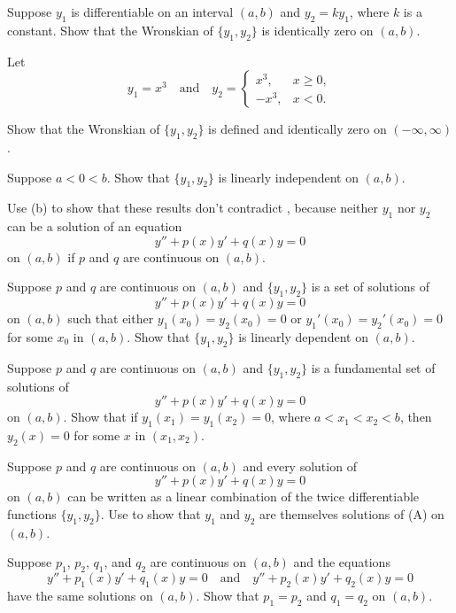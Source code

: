 \begin{exerciselist}
\item\label{exer:5.1.28}Suppose $y_1$ is differentiable on an interval  $(a,b)$
and $y_2=ky_1$, where $k$ is a constant. Show that the Wronskian of
$\{y_1,y_2\}$ is identically zero on  $(a,b)$.

\item\label{exer:5.1.29}Let
\[
y_1=x^3\quad\text{and}\quad y_2=
\begin{cases}
x^3,&x\ge 0,\\
-x^3,&x<0.
\end{cases}
\]
\begin{alist}
\item %
Show that the Wronskian of $\{y_1,y_2\}$ is defined and identically
zero on
$(-\infty,\infty)$.
\item %
Suppose $a<0<b$.
Show that $\{y_1,y_2\}$ is linearly independent on  $(a,b)$.
\item %
Use (b) to show that these results don't
contradict , because neither $y_1$ nor $y_2$
can be a solution of an equation
\[
y''+p(x)y'+q(x)y=0
\]
on  $(a,b)$ if $p$ and $q$ are continuous on  $(a,b)$.
\end{alist}

\item\label{exer:5.1.30}Suppose  $p$ and $q$ are continuous  on  $(a,b)$ and
$\{y_1,y_2\}$ is a  set of solutions of
\[
y''+p(x)y'+q(x)y=0
\]
on $(a,b)$ such that either $y_1(x_0)=y_2(x_0)=0$ or
$y_1'(x_0)=y_2'(x_0)=0$  for some $x_0$ in $(a,b)$. Show that
$\{y_1,y_2\}$ is linearly dependent on $(a,b)$.

\item\label{exer:5.1.31}Suppose  $p$ and $q$ are continuous  on  $(a,b)$ and
  $\{y_1,y_2\}$ is
a fundamental set of solutions of
\[
y''+p(x)y'+q(x)y=0
\]
on $(a,b)$. Show that if $y_1(x_1)=y_1(x_2)=0$, where $a<x_1<x_2<b$,
then $y_2(x)=0$ for some $x$ in $(x_1,x_2)$. 

\item\label{exer:5.1.32}Suppose $p$ and $q$ are continuous on  $(a,b)$ and
 every solution of
\[
y''+p(x)y'+q(x)y=0
\tag{A}
\]
on $(a,b)$ can be
written as a linear combination of the twice differentiable
functions $\{y_1,y_2\}$. Use  to show that
$y_1$ and $y_2$ are themselves solutions of  (A) on
$(a,b)$.

\item\label{exer:5.1.33}Suppose  $p_1$, $p_2$, $q_1$, and $q_2$ are continuous on
$(a,b)$  and the equations
\[
y''+p_1(x)y'+q_1(x)y=0 \quad\text{and}\quad
y''+p_2(x)y'+q_2(x)y=0
\]
have the same solutions on $(a,b)$. Show that $p_1=p_2$ and $q_1=q_2$
on $(a,b)$.


\end{exerciselist}
